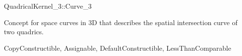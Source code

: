 
\begin{ccRefConcept}{QuadricalKernel_3::Curve_3}

Concept for space curves in 3D that describes the spatial intersection curve
of two quadrics.

\ccRefines
CopyConstructible, Assignable, DefaultConstructible, LessThanComparable


\end{ccRefConcept}
